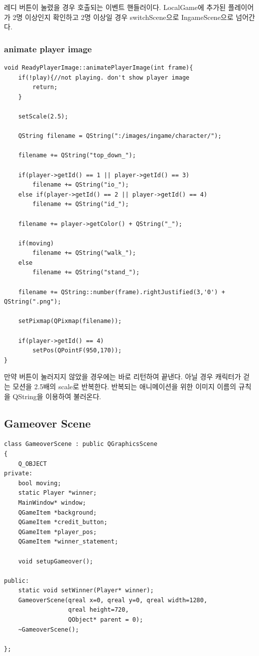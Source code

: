 \documentclass[10pt,oneside,a4paper,titlepage]{article}
\begin{document}
레디 버튼이 눌렸을 경우 호출되는 이벤트 핸들러이다. LocalGame에 추가된 플레이어가 2명 이상인지 확인하고 2명 이상일 경우 switchScene으로 IngameScene으로 넘어간다.

\subsubsection{animate player image}
\begin{lstlisting}
void ReadyPlayerImage::animatePlayerImage(int frame){
    if(!play){//not playing. don't show player image
        return;
    }

    setScale(2.5);

    QString filename = QString(":/images/ingame/character/");

    filename += QString("top_down_");

    if(player->getId() == 1 || player->getId() == 3)
        filename += QString("io_");
    else if(player->getId() == 2 || player->getId() == 4)
        filename += QString("id_");

    filename += player->getColor() + QString("_");

    if(moving)
        filename += QString("walk_");
    else
        filename += QString("stand_");

    filename += QString::number(frame).rightJustified(3,'0') + QString(".png");

    setPixmap(QPixmap(filename));

    if(player->getId() == 4)
        setPos(QPointF(950,170));
}
\end{lstlisting}

만약 버튼이 눌러지지 않았을 경우에는 바로 리턴하여 끝낸다. 아닐 경우 캐릭터가 걷는 모션을 2.5배의 scale로 반복한다. 반복되는 애니메이션을 위한 이미지 이름의 규칙을 QString을 이용하여 불러온다.

\subsection{Gameover Scene}

\begin{lstlisting}
class GameoverScene : public QGraphicsScene
{
    Q_OBJECT
private:
    bool moving;
    static Player *winner;
    MainWindow* window;
    QGameItem *background;
    QGameItem *credit_button;
    QGameItem *player_pos;
    QGameItem *winner_statement;

    void setupGameover();

public:
    static void setWinner(Player* winner);
    GameoverScene(qreal x=0, qreal y=0, qreal width=1280,
                  qreal height=720,
                  QObject* parent = 0);
    ~GameoverScene();

};
\end{lstlisting}
\end{document}
